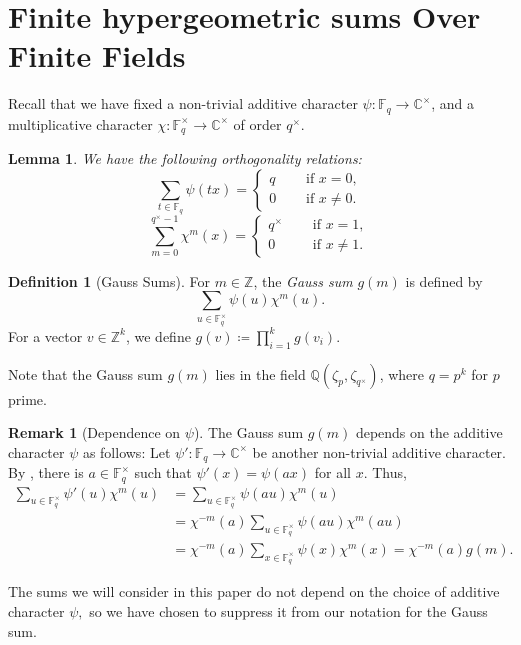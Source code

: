 \documentclass[11pt, reqno]{amsart}
\theoremstyle{plain}
\newtheorem{lem}[theo]{Lemma}
\theoremstyle{definition}
\newtheorem{defi}[theo]{Definition}
\newtheorem{rem}[theo]{Remark}
\newcommand{\Z}{\mathbb{Z}}
\newcommand{\Q}{\mathbb{Q}}
\newcommand{\F}{\mathbb{F}}
\newcommand{\C}{\mathbb{C}}
\begin{document}
\section{Finite hypergeometric sums Over Finite Fields}\label{section:hypergeometric-function}
Recall that we have fixed a non-trivial additive character $\psi: \F_q \to \C^\times$, and a multiplicative character $\chi: \F_q^\times \to \C^\times$ of order $q^\times$. 

\begin{lem} \label{lem:orthogonal} We have the following orthogonality relations:
\begin{equation*}
    \sum_{t \in \F_q} \psi(tx) = \begin{cases}
        q \quad & \text{ if } x =0,\\
        0 \quad & \text{ if } x\neq 0.
    \end{cases}
\end{equation*}
\begin{equation*}
   \sum_{m=0}^{q^\times-1} \chi^{m}(x) =   \begin{cases}
        q^\times \quad & \text{ if }x =1,\\
        0 \quad & \text{ if } x \neq 1.
        \end{cases}
\end{equation*}
\end{lem}

\begin{defi}[Gauss Sums] \label{defi:gauss-sums}
For $m \in \Z$, the \emph{Gauss sum} $g(m)$ is defined by
\[
\sum_{u \in \F_q^\times } \psi(u) \chi^m(u).
\]
For a vector $v \in \mathbb{Z}^{k}$, we define $g(v)\coloneqq \prod_{i=1}^k g(v_i)$.
\end{defi}
Note that the Gauss sum $g(m)$ lies in the field $\Q(\zeta_{p},\zeta_{q^\times})$, where $q= p^{k}$ for $p$ prime.
\begin{rem}[Dependence on $\psi$] \label{rem:dependence-gauss-sums}
The Gauss sum $g(m)$ depends on the additive character $\psi$ as follows:
Let $\psi':\F_q \to \C^\times$ be another non-trivial additive character. By  \cite[Proposition 2.5.4]{Cohen-book}, there is $a \in \F_q^{\times}$ such that $\psi'(x) = \psi(ax)$ for all $x$. Thus,
    \begin{align*}
        \sum_{u \in \F_q^\times } \psi'(u) \chi^m(u) &= \sum_{u \in \F_q^\times } \psi(au) \chi^m(u)\\
        &= \chi^{-m}(a)\sum_{u \in \F_q^\times } \psi(au) \chi^m(au) \\
        &= \chi^{-m}(a) \sum_{x \in \F_q^\times } \psi(x) \chi^m(x) =\chi^{-m}(a)g(m).
    \end{align*}

The sums we will consider in this paper do not depend on the choice of additive character $\psi,$ so we have chosen to suppress it from our notation for the Gauss sum.
\end{rem}
\end{document}
